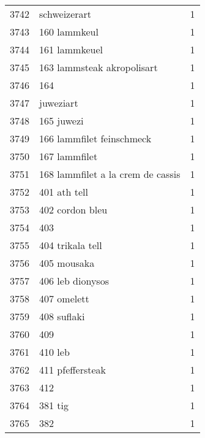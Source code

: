 \begin{tabular}{llr}
3742 &                                       schweizerart &      1 \\
3743 &                                       160 lammkeul &      1 \\
3744 &                                      161 lammkeuel &      1 \\
3745 &                         163 lammsteak akropolisart &      1 \\
3746 &                                                164 &      1 \\
3747 &                                          juweziart &      1 \\
3748 &                                         165 juwezi &      1 \\
3749 &                          166 lammfilet feinschmeck &      1 \\
3750 &                                      167 lammfilet &      1 \\
3751 &                  168 lammfilet a la crem de cassis &      1 \\
3752 &                                       401 ath tell &      1 \\
3753 &                                    402 cordon bleu &      1 \\
3754 &                                                403 &      1 \\
3755 &                                   404 trikala tell &      1 \\
3756 &                                        405 mousaka &      1 \\
3757 &                                   406 leb dionysos &      1 \\
3758 &                                        407 omelett &      1 \\
3759 &                                        408 suflaki &      1 \\
3760 &                                                409 &      1 \\
3761 &                                            410 leb &      1 \\
3762 &                                   411 pfeffersteak &      1 \\
3763 &                                                412 &      1 \\
3764 &                                            381 tig &      1 \\
3765 &                                                382 &      1 \\

\end{tabular}
